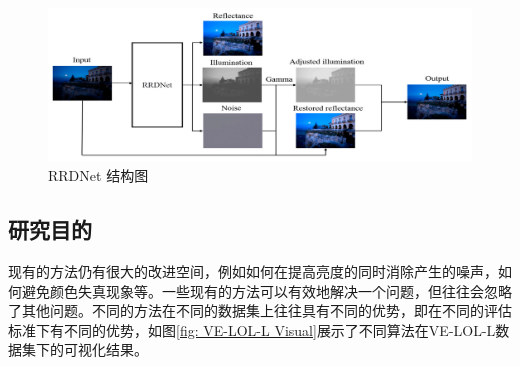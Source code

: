 \documentclass[a4paper, 10pt]{article}
\begin{document}
	\begin{figure}[htb]
		\centering 
		\includegraphics[width=0.7\columnwidth]{picture/LLIE/RRDNet/RRDNet}
		\caption{
			\label{fig: RRDNet} 
			RRDNet 结构图
		}
	\end{figure}
	
	\subsection{研究目的}
	
	现有的方法仍有很大的改进空间，例如如何在提高亮度的同时消除产生的噪声，如何避免颜色失真现象等。一些现有的方法可以有效地解决一个问题，但往往会忽略了其他问题。不同的方法在不同的数据集上往往具有不同的优势，即在不同的评估标准下有不同的优势，如图\ref{fig: VE-LOL-L Visual}展示了不同算法在VE-LOL-L数据集下的可视化结果。
	
\end{document}
